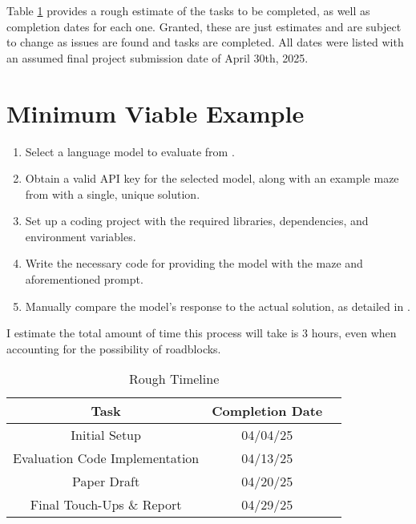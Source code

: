 \documentclass[conference]{IEEEtran}
\begin{document}
Table \ref{table:timeline} provides a rough estimate of the tasks to be completed, as well as completion dates for each one. Granted, these are just estimates and are subject to change as issues are found and tasks are completed. All dates were listed with an assumed final project submission date of April 30th, 2025.

\section{Minimum Viable Example}
\begin{enumerate}
    \item[\textbf{1.}] Select a language model to evaluate from \cite{ext4}.
    \item[\textbf{2.}] Obtain a valid API key for the selected model, along with an example maze from \cite{int1} with a single, unique solution.
    \item[\textbf{3.}] Set up a coding project with the required libraries, dependencies, and environment variables.
    \item[\textbf{4.}] Write the necessary code for providing the model with the maze and aforementioned prompt.
    \item[\textbf{5.}] Manually compare the model's response to the actual solution, as detailed in \cite{int1}.
\end{enumerate}
I estimate the total amount of time this process will take is 3 hours, even when accounting for the possibility of roadblocks.

\begin{table}[t!]
    \begin{center}
        \begin{tabular}{ |c|c|c| }
            \hline
            \textbf{Task} & \textbf{Completion Date} \\
            \hline
            Initial Setup & 04/04/25\\ 
            \hline
            Evaluation Code Implementation & 04/13/25\\
            \hline
            Paper Draft & 04/20/25 \\
            \hline
            Final Touch-Ups \& Report & 04/29/25\\
            \hline
        \end{tabular}
    \caption{Rough Timeline}
    \label{table:timeline}
    \end{center}
\end{table}
\end{document}
